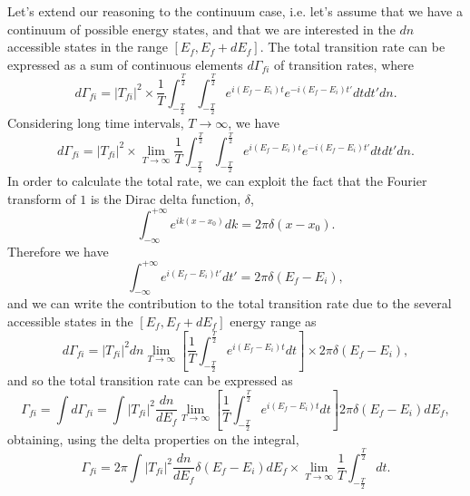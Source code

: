 Let's extend our reasoning to the continuum case, i.e. let's assume that we have a continuum of possible energy states, and that we are interested in the $dn$ accessible states in the range $[E_{f},E_{f}+dE_{f}]$. The total transition rate  can be expressed as a sum of continuous elements $d\Gamma_{fi}$ of transition rates, where
\begin{equation*}
    d\Gamma_{fi} = |T_{fi}|^2\times\frac{1}{T}\int_{-\frac{T}{2}}^{\frac{T}{2}}\int_{-\frac{T}{2}}^{\frac{T}{2}}e^{i(E_{f}-E_{i})t}e^{-i(E_{f}-E_{i})t'}dtdt'dn.
\end{equation*}
Considering long time intervals, $T\rightarrow\infty$, we have
\begin{equation*}
    d\Gamma_{fi} = |T_{fi}|^2\times\lim_{T\rightarrow \infty}\frac{1}{T}\int_{-\frac{T}{2}}^{\frac{T}{2}}\int_{-\frac{T}{2}}^{\frac{T}{2}}e^{i(E_{f}-E_{i})t}e^{-i(E_{f}-E_{i})t'}dtdt'dn.
\end{equation*}
In order to calculate the total rate, we can exploit the fact that the Fourier transform of $1$ is the Dirac delta function, $\delta$,
\begin{equation*}
    \int_{-\infty}^{+\infty}e^{ik(x-x_0)}dk = 2\pi\delta(x-x_0).
\end{equation*}
Therefore we have 
\begin{equation*}
    \int_{-\infty}^{+\infty}e^{i(E_{f}-E_{i})t'}dt' = 2\pi\delta(E_{f}-E_{i}),
\end{equation*}
and we can write the contribution to the total transition rate due to the several accessible states in the $[E_{f},E_{f}+dE_{f}]$ energy range as
\begin{equation*}
    d\Gamma_{fi} = |T_{fi}|^2 dn \lim_{T\rightarrow \infty}\left[\frac{1}{T}\int_{-\frac{T}{2}}^{\frac{T}{2}}e^{i(E_{f}-E_{i})t}dt \right] \times 2\pi\delta(E_{f}-E_{i}),
\end{equation*}
and so the total transition rate can be expressed as
\begin{equation*}
    \Gamma_{fi} = \int d\Gamma_{fi} = \int |T_{fi}|^2 \frac{dn}{dE_{f}}\lim_{T\rightarrow \infty}\left[\frac{1}{T}\int_{-\frac{T}{2}}^{\frac{T}{2}}e^{i(E_{f}-E_{i})t}dt\right]2\pi\delta(E_{f}-E_{i})dE_{f},
\end{equation*}
obtaining, using the delta properties on the integral,
\begin{equation*}
    \Gamma_{fi} = 2\pi\int|T_{fi}|^2 \frac{dn}{dE_{f}}\delta(E_{f}-E_{i})dE_{f}\times \lim_{T\rightarrow \infty} \frac{1}{T}\int_{-\frac{T}{2}}^{\frac{T}{2}}dt.
\end{equation*}

